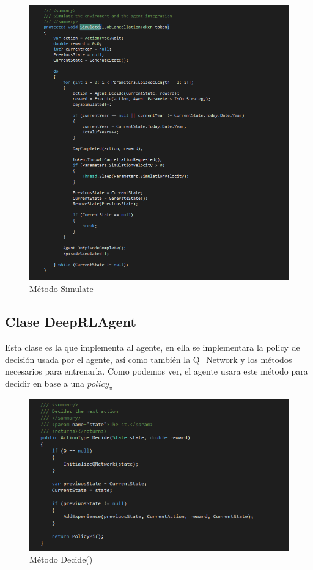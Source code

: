 \begin{figure}[h!]
	\centering
	\includegraphics[scale=0.7]{imagenes/screen5.png}
	\caption{Método Simulate}
\end{figure}

\clearpage
\subsection{Clase DeepRLAgent}

Esta clase es la que implementa al agente, en ella se implementara la policy de decisión usada por el agente, así como también la Q\_Network y los métodos necesarios para entrenarla.
Como podemos ver, el agente usara este método para decidir en base a una $policy_\pi$
\begin{figure}[h!]
	\centering
	\includegraphics[scale=0.6]{imagenes/screen6.png}
	\caption{Método Decide()}
\end{figure}

